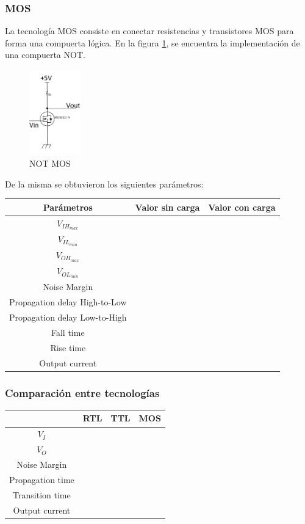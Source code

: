 \subsubsection{MOS}
La tecnología MOS consiste en conectar resistencias y transistores MOS para forma una compuerta lógica. En la figura \ref{fig:eje1_3}, se encuentra la implementación de una compuerta NOT.
\begin{figure}[H]
	\centering
	\includegraphics[width=0.2\textwidth]{Ejercicio1/MOS.png}
	\caption{NOT MOS}
	\label{fig:eje1_3}
\end{figure}
De la misma se obtuvieron los siguientes parámetros:
\begin{table}[H]
	\centering
	\begin{tabular}{|c|c|c|}
		\hline
		Parámetros & Valor sin carga & Valor con carga\\
		\hline
		$V_{IH_{max}}$ & & \\
		\hline
		$V_{IL_{min}}$ & & \\
		\hline
		$V_{OH_{max}}$ & & \\
		\hline
		$V_{OL_{min}}$ & & \\
		\hline
		Noise Margin & & \\
		\hline
		Propagation delay High-to-Low & & \\
		\hline
		Propagation delay Low-to-High & & \\
		\hline
		Fall time & & \\
		\hline
		Rise time & & \\
		\hline
		Output current & & \\
		\hline
	\end{tabular}
\end{table}

\subsubsection{Comparación entre tecnologías}
\begin{table}[H]
	\centering
	\begin{tabular}{|c|c|c|c|}
		\hline
		\diagbox{Parámetros}{Tecnologías} & RTL	& TTL & MOS\\
		\hline
		$V_I$ & & & \\
		\hline
		$V_O$ & & & \\
		\hline
		Noise Margin & & & \\
		\hline
		Propagation time & & & \\
		\hline
		Transition time & & & \\
		\hline
		Output current & & & \\
		\hline
	\end{tabular}
\end{table}